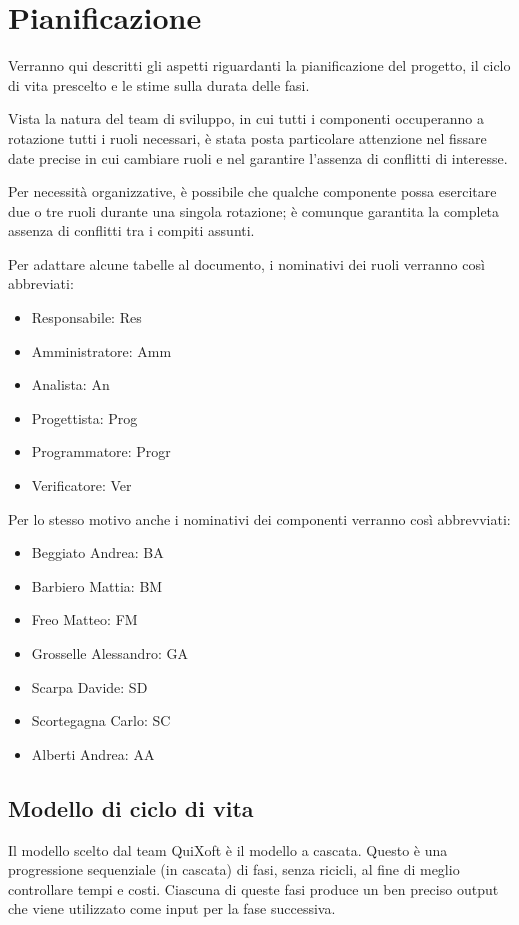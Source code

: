 \documentclass[11pt,a4paper]{article}
\begin{document}
\section{Pianificazione}
Verranno qui descritti gli aspetti riguardanti la pianificazione del progetto, il ciclo di vita prescelto e le stime sulla durata delle fasi.

Vista la natura del team di sviluppo, in cui tutti i componenti occuperanno a rotazione tutti i ruoli necessari, è stata posta particolare attenzione nel fissare date precise in cui cambiare ruoli e nel garantire l'assenza di conflitti di interesse.

Per necessità organizzative, è possibile che qualche componente possa esercitare due o tre ruoli durante una singola rotazione; è comunque garantita la completa assenza di conflitti tra i compiti assunti.
\bigskip

Per adattare alcune tabelle al documento, i nominativi dei ruoli verranno così abbreviati:
\begin{itemize}
\item Responsabile: Res
\item Amministratore: Amm
\item Analista: An
\item Progettista: Prog
\item Programmatore: Progr
\item Verificatore: Ver
\end{itemize}
\bigskip
Per lo stesso motivo anche i nominativi dei componenti verranno così abbrevviati:
\begin{itemize}
\item Beggiato Andrea: BA
\item Barbiero Mattia: BM
\item Freo Matteo: FM
\item Grosselle Alessandro: GA
\item Scarpa Davide: SD
\item Scortegagna Carlo: SC
\item Alberti Andrea: AA
\end{itemize}
\subsection{Modello di ciclo di vita}
Il modello scelto dal team QuiXoft è il modello a cascata.
Questo è una progressione sequenziale (in cascata) di fasi, senza ricicli, al fine di meglio controllare tempi e costi.
Ciascuna di queste fasi produce un ben preciso output che viene utilizzato come input per la fase successiva.
\end{document}
